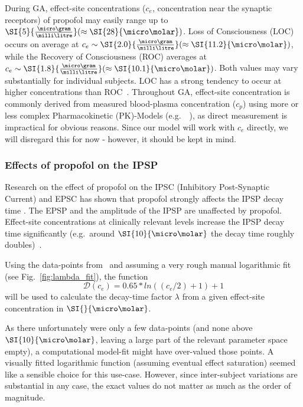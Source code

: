 During GA, effect-site concentrations ($c_{e}$, concentration near the synaptic receptors) of propofol may easily range
up to
$\SI{5}{\frac{\micro\gram}{\milli\litre}} (\approx\SI{28}{\micro\molar})$.
Loss of Consciousness (LOC) occurs on average at $c_e \sim\SI{2.0}{\frac{\micro\gram}{\milli\litre}} (\approx\SI{11
.2}{\micro\molar})$,
while the Recovery of Consciousness (ROC) averages at $c_e \sim\SI{1.8}{\frac{\micro\gram}{\milli\litre}}
(\approx\SI{10.1}{\micro\molar})$.
Both values may vary substantially for individual subjects.
LOC has a strong tendency to occur at higher concentrations than ROC~\cite{iwakiri_individual_2005,
    ferreira_patterns_2020}.
Throughout GA, effect-site concentration is commonly derived from measured
blood-plasma concentration ($c_p$) using more or less complex Pharmacokinetic (PK)-Models
(e.g.\ ~\cite{eleveld_general_2014, liang_pharmacokinetics-neural_2015}),
as direct measurement is impractical for obvious reasons.
Since our model will work with $c_{e}$ directly, we will disregard this for now - however, it should be kept in mind.


\subsubsection{Effects of propofol on the IPSP}

Research on the effect of propofol on the IPSC (Inhibitory Post-Synaptic Current) and EPSC
has shown that propofol strongly affects the IPSP decay time \cite{kitamura_effects_2003, mcdougall_propofol_2008}.
The EPSP and the amplitude of the IPSP are unaffected by propofol.
Effect-site concentrations at clinically relevant levels increase the IPSP decay time
significantly (e.g.\ around $\SI{10}{\micro\molar}$ the decay time roughly doubles)~\cite{kitamura_effects_2003}.


Using the data-points from~\cite{kitamura_effects_2003}
and assuming a very rough manual logarithmic fit (see Fig.~\ref{fig:lambda_fit}),
the function
        \[ \mathscr{D}(c_{e}) = 0.65*ln((c_{e}/2)+1)+1 \]
will be used to calculate the decay-time factor $\lambda$ from a given
effect-site concentration in $\SI{}{\micro\molar}$.

As there unfortunately were only a few data-points (and none above $\SI{10}{\micro\molar}$,
leaving a large part of the relevant parameter space empty),
a computational model-fit might have over-valued those points.
A visually fitted logarithmic function (assuming eventual effect saturation) seemed like a sensible choice
for this use-case.
However, since inter-subject variations are substantial in any case,
the exact values do not matter as much as the order of magnitude.


